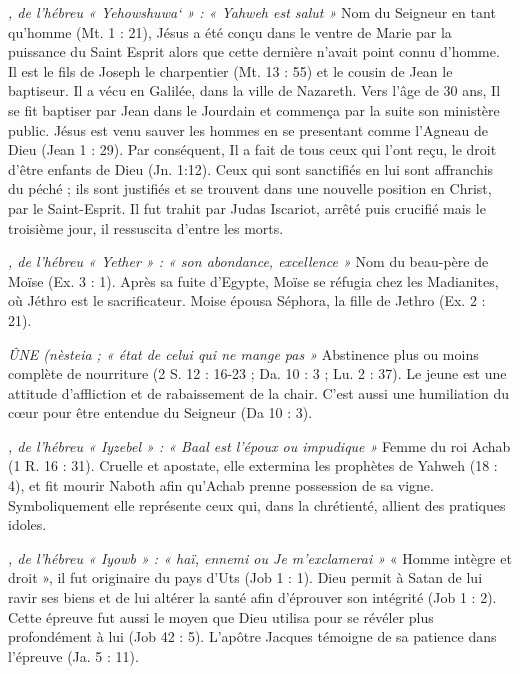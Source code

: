 \begin{multicols}{2}
\textit{, de l'hébreu « Yehowshuwa` » : « Yahweh est salut »}\newline
Nom du Seigneur en tant qu'homme (Mt. 1 : 21), Jésus a été conçu dans le ventre de Marie par la puissance du Saint Esprit alors que cette dernière n'avait point connu d'homme. Il est le fils de Joseph le charpentier (Mt. 13 : 55) et le cousin de Jean le baptiseur. Il a vécu en Galilée, dans la ville de Nazareth. Vers l'âge de 30 ans, Il se fit baptiser par Jean dans le Jourdain et commença par la suite son ministère public. Jésus est venu sauver les hommes en se presentant comme l'Agneau de Dieu (Jean 1 : 29). Par conséquent, Il a fait de tous ceux qui l’ont reçu, le droit d’être enfants de Dieu (Jn. 1:12). Ceux qui sont sanctifiés en lui sont affranchis du péché ; ils sont justifiés et se trouvent dans une nouvelle position en Christ, par le Saint-Esprit. Il fut trahit par Judas Iscariot, arrêté puis crucifié mais le troisième jour, il ressuscita d’entre les morts.

\textit{, de l'hébreu « Yether » : « son abondance, excellence »}\newline
Nom du beau-père de Moïse (Ex. 3 : 1).
Après sa fuite d'Egypte, Moïse se réfugia chez les Madianites, où Jéthro est le sacrificateur. Moise épousa Séphora, la fille de Jethro (Ex. 2 : 21).

\textit{ÛNE (nèsteia ; « état de celui qui ne mange pas »}\newline
Abstinence plus ou moins complète de nourriture (2 S. 12 : 16-23 ; Da. 10 : 3 ; Lu. 2 : 37). Le jeune est une attitude d'affliction et de rabaissement de la chair. C'est aussi une humiliation du cœur pour être entendue du Seigneur (Da 10 : 3).

\textit{, de l'hébreu « Iyzebel » : « Baal est l'époux ou impudique »}\newline
Femme du roi Achab (1 R. 16 : 31). Cruelle et apostate, elle extermina les prophètes de Yahweh (18 : 4), et fit mourir Naboth afin qu'Achab prenne possession de sa vigne. Symboliquement elle représente ceux qui, dans la chrétienté, allient des pratiques idoles.

\textit{, de l'hébreu « Iyowb » : « haï, ennemi ou Je m'exclamerai »}\newline
« Homme intègre et droit », il fut originaire du pays d'Uts (Job 1 : 1). Dieu permit à Satan de lui ravir ses biens et de lui altérer la santé afin d'éprouver son intégrité (Job 1 : 2). Cette épreuve fut aussi le moyen que Dieu utilisa pour se révéler plus profondément à lui (Job 42 : 5). L'apôtre Jacques témoigne de sa patience dans l'épreuve (Ja. 5 : 11).


\end{multicols}
